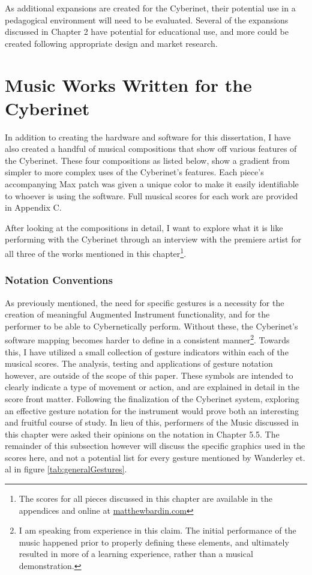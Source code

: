As additional expansions are created for the Cyberinet, their potential use in a pedagogical environment will need to be evaluated. Several of the expansions discussed in Chapter 2 have potential for educational use, and more could be created following appropriate design and market research.

\chapter{Music Works Written for the Cyberinet}

In addition to creating the hardware and software for this dissertation, I have also created a handful of musical compositions that show off various features of the Cyberinet. These four compositions as listed below, show a gradient from simpler to more complex uses of the Cyberinet’s features. Each piece's accompanying Max patch was given a unique color to make it easily identifiable to whoever is using the software. Full musical scores for each work are provided in Appendix C.

After looking at the compositions in detail, I want to explore what it is like performing with the Cyberinet through an interview with the premiere artist for all three of the works mentioned in this chapter\footnote{The scores for all pieces discussed in this chapter are available in the appendices and online at \url{matthewbardin.com}}.

\subsection{Notation Conventions}

As previously mentioned, the need for specific gestures is a necessity for the creation of meaningful Augmented Instrument functionality, and for the performer to be able to Cybernetically perform. Without these, the Cyberinet's software mapping becomes harder to define in a consistent manner\footnote{I am speaking from experience in this claim. The initial performance of the music happened prior to properly defining these elements, and ultimately resulted in more of a learning experience, rather than a musical demonstration.}. Towards this, I have utilized a small collection of gesture indicators within each of the musical scores. The analysis, testing and applications of gesture notation however, are outside of the scope of this paper. These symbols are intended to clearly indicate a type of movement or action, and are explained in detail in the score front matter. Following the finalization of the Cyberinet system, exploring an effective gesture notation for the instrument would prove both an interesting and fruitful course of study. In lieu of this, performers of the Music discussed in this chapter were asked their opinions on the notation in Chapter 5.5. The remainder of this subsection however will discuss the specific graphics used in the scores here, and not a potential list for every gesture mentioned by Wanderley et. al in figure \ref{tab:generalGestures}.


